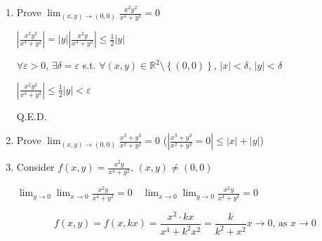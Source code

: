 \begin{example}
    \begin{enumerate}
        \item Prove $\lim_{(x,y)\to(0,0)}\frac{x^2y^2}{x^4+y^2}=0$
              \begin{pf}
                  $\left|\frac{x^2y^2}{x^4+y^2}\right|=|y|\left|\frac{x^2y}{x^4+y^2}\right|\leq\frac{1}{2}|y|$

                  $\forall\varepsilon>0,\,\exists\delta=\varepsilon$ s.t. $\forall(x,y)\in\mathbb{R}^2\setminus\left\{(0,0)\right\},\,|x|<\delta,\,|y|<\delta$

                  $\left|\frac{x^2y^2}{x^4+y^2}\right|\leq\frac{1}{2}|y|<\varepsilon$

                  Q.E.D.
              \end{pf}
        \item Prove $\lim_{(x,y)\to(0,0)}\frac{x^3+y^3}{x^2+y^2}=0$ ($\left|\frac{x^3+y^3}{x^2+y^2}=0\right|\leq|x|+|y|$)
        \item Consider $f(x,y)=\frac{x^2y}{x^4+y^2},\,(x,y)\neq(0,0)$

              $\lim_{y\to 0}\lim_{x\to 0}\frac{x^2y}{x^4+y^2}=0\quad\lim_{x\to 0}\lim_{y\to 0}\frac{x^2y}{x^4+y^2}=0$

              $$
                  f(x,y)=f(x,kx)=\frac{x^2\cdot kx}{x^4+k^2x^2}=\frac{k}{k^2+x^2}x\to 0\text{, as }x\to 0
              $$


    \end{enumerate}
\end{example}

